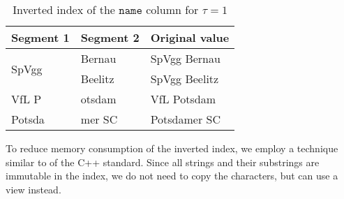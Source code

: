 \begin{table}[ht]
\centering
\caption{Inverted index of the $\mathtt{name}$ column for $\tau = 1$}
\label{fig:impl:index}
\begin{tabular}{@{}lll@{}}
    \toprule
        Segment 1 & Segment 2 & Original value  \\
        \midrule
        \multirow{2}{*}{SpVgg} & Bernau & SpVgg Bernau\\
        & Beelitz & SpVgg Beelitz\\ \midrule
        VfL P & otsdam & VfL Potsdam \\ \midrule
        Potsda & mer SC & Potsdamer SC\\
\bottomrule
\end{tabular}
\end{table}

To reduce memory consumption of the inverted index, we employ a technique similar to  of the C++ standard.
Since all strings and their substrings are immutable in the index, we do not need to copy the characters, but can use a view instead.

